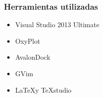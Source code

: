 \begin{frame}
	\frametitle{Herramientas utilizadas}
	
	\begin{itemize}
		\item Visual Studio 2013 Ultimate
		\item OxyPlot
		\item AvalonDock
		\item GVim
		\item \LaTeX y TeXstudio
	\end{itemize}
\end{frame}